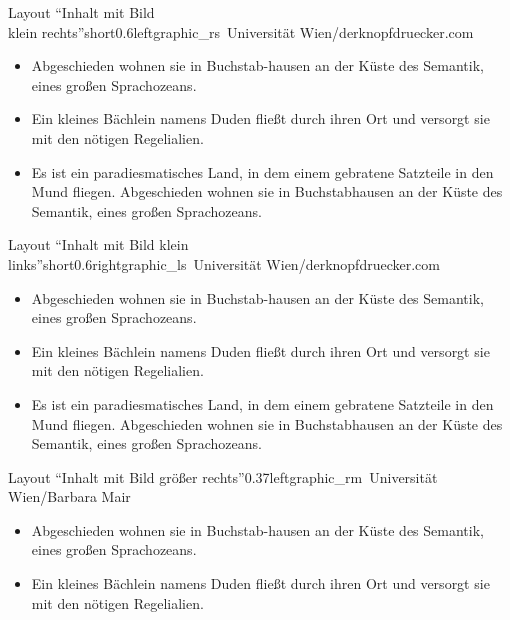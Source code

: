 \documentclass[hyperref={pdfpagelabels=false}, aspectratio=43, t]{beamer}  %
\begin{document}
\begin{graphicsFrame}{Layout ``Inhalt mit Bild \\ klein rechts''}{short}{0.6}{left}{graphic_rs}{\textcopyright~Universität Wien/derknopfdruecker.com}

		\begin{itemize}
			\item Abgeschieden wohnen sie in Buchstab-hausen an der Küste des Semantik, eines großen Sprachozeans.
			\item Ein kleines Bächlein namens Duden fließt durch ihren Ort und versorgt sie mit den nötigen Regelialien.
			\item Es ist ein paradiesmatisches Land, in dem einem gebratene Satzteile in den Mund fliegen. Abgeschieden wohnen sie in Buchstabhausen an der Küste des Semantik, eines großen Sprachozeans. 
		\end{itemize}

\end{graphicsFrame}

\begin{graphicsFrame}{Layout ``Inhalt mit Bild klein \\ links''}{short}{0.6}{right}{graphic_ls}{\textcopyright~Universität Wien/derknopfdruecker.com}

		\begin{itemize}
			\item Abgeschieden wohnen sie in Buchstab-hausen an der Küste des Semantik, eines großen Sprachozeans.
			\item Ein kleines Bächlein namens Duden fließt durch ihren Ort und versorgt sie mit den nötigen Regelialien.
			\item Es ist ein paradiesmatisches Land, in dem einem gebratene Satzteile in den Mund fliegen. Abgeschieden wohnen sie in Buchstabhausen an der Küste des Semantik, eines großen Sprachozeans.
		\end{itemize}

\end{graphicsFrame}

\begin{graphicsFrame}{Layout ``Inhalt mit Bild größer rechts''}{}{0.37}{left}{graphic_rm}{\textcopyright~Universität Wien/Barbara Mair}

		\begin{itemize}
			\item Abgeschieden wohnen sie in Buchstab-hausen an der Küste des Semantik, eines großen Sprachozeans.
			\item Ein kleines Bächlein namens Duden fließt durch ihren Ort und versorgt sie mit den nötigen Regelialien.
		\end{itemize}

\end{graphicsFrame}
\end{document}
